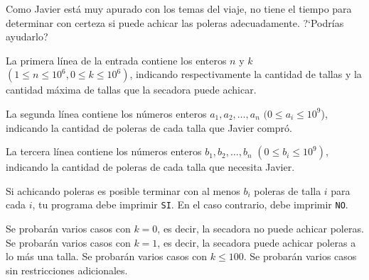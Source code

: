 \documentclass{oci}
\begin{document}
\begin{problemDescription}
Como Javier está muy apurado con los temas del viaje, no tiene el tiempo para determinar
con certeza si puede achicar las poleras adecuadamente.
?`Podrías ayudarlo?
\end{problemDescription}

\begin{inputDescription}
La primera línea de la entrada contiene los enteros $n$ y $k$ $(1 \leq n \leq 10^6, 0 \leq k \leq 10^6)$,
indicando respectivamente la cantidad de tallas y la cantidad máxima de tallas que la secadora puede achicar.

La segunda línea contiene los números enteros $a_1, a_2, \dots, a_n$ $(0 \leq a_i \leq 10^9$),
indicando la cantidad de poleras de cada talla que Javier compró.

La tercera línea contiene los números enteros $b_1, b_2, \dots, b_n$ $(0 \leq b_i \leq 10^9)$, indicando
la cantidad de poleras de cada talla que necesita Javier.
\end{inputDescription}

\begin{outputDescription}
Si achicando poleras es posible terminar con al menos $b_i$
poleras de talla $i$ para cada $i$, tu programa debe imprimir \texttt{SI}.
En el caso contrario, debe imprimir \texttt{NO}.
\end{outputDescription}

\begin{scoreDescription}
  Se probarán varios casos con $k=0$, es decir, la secadora no puede achicar poleras.
  Se probarán varios casos con $k=1$, es decir, la secadora puede achicar poleras a lo más una talla.
  Se probarán varios casos con $k \leq 100$.
  Se probarán varios casos sin restricciones adicionales.
\end{scoreDescription}
\end{document}
